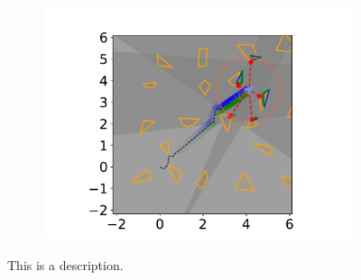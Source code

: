 \begin{figure}[h]
\begin{subfigure}{0.20\textwidth}
        \includegraphics[width=\textwidth]{../figures/Simulations/sim2unkenv/frame_9.pdf}
    \end{subfigure}

    \caption[short]{This is a description.}
\end{figure}